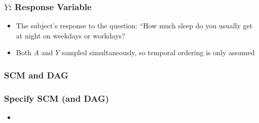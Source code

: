\documentclass{beamer}
\begin{document}
\begin{frame}
 \frametitle{$Y$: Response Variable}
  \begin{itemize}
    \item The subject's response to the question: ``How much sleep do you usually get at night on weekdays or workdays?
    \item Both $A$ and $Y$ sampled simultaneously, so temporal ordering is only assumed
  \end{itemize}

\end{frame}

\begin{frame}
\frametitle{SCM and DAG}
\end{frame}

\begin{frame}
 \frametitle{Specify  SCM (and DAG)}
  \begin{itemize}
    \item 
  \end{itemize}

\end{frame}
\end{document}
